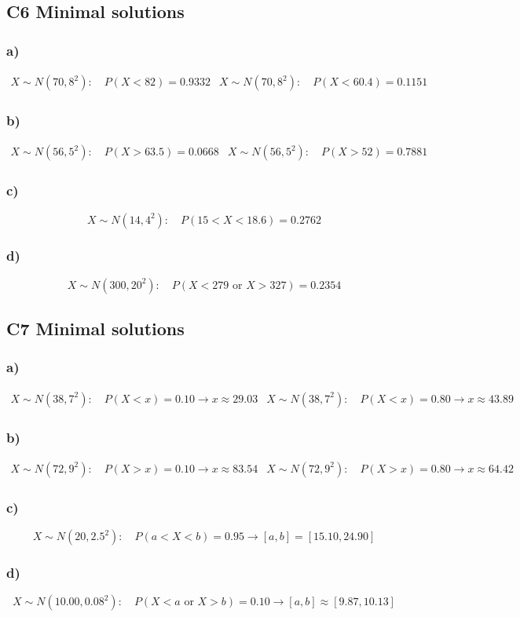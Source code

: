 \subsection{C6 Minimal solutions}

\subsubsection*{a)}
\[
\begin{array}{ll}
	X\sim N(70,8^2):\quad P(X<82)=0.9332
	&
	X\sim N(70,8^2):\quad P(X<60.4)=0.1151
\end{array}
\]

\subsubsection*{b)}
\[
\begin{array}{ll}
	X\sim N(56,5^2):\quad P(X>63.5)=0.0668
	&
	X\sim N(56,5^2):\quad P(X>52)=0.7881
\end{array}
\]

\subsubsection*{c)}
\[
X\sim N(14,4^2):\quad P(15<X<18.6)=0.2762
\]

\subsubsection*{d)}
\[
X\sim N(300,20^2):\quad P(X<279\text{ or }X>327)=0.2354
\]

\subsection{C7 Minimal solutions}

\subsubsection*{a)}
\[
\begin{array}{ll}
	X\sim N(38,7^2):\quad P(X<x)=0.10 \longrightarrow x\approx 29.03
	&
	X\sim N(38,7^2):\quad P(X<x)=0.80 \longrightarrow x\approx 43.89
\end{array}
\]

\subsubsection*{b)}
\[
\begin{array}{ll}
	X\sim N(72,9^2):\quad P(X>x)=0.10 \longrightarrow x\approx 83.54
	&
	X\sim N(72,9^2):\quad P(X>x)=0.80 \longrightarrow x\approx 64.42
\end{array}
\]

\subsubsection*{c)}
\[
X\sim N(20,2.5^2):\quad P(a<X<b)=0.95 \longrightarrow [a,b]=[15.10,24.90]
\]

\subsubsection*{d)}
\[
X\sim N(10.00,0.08^2):\quad P(X<a\text{ or }X>b)=0.10 \longrightarrow [a,b]\approx[9.87,10.13]
\]



